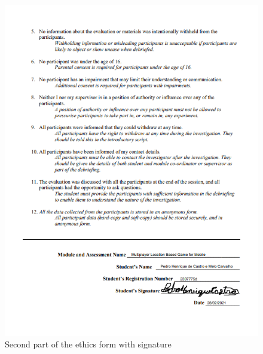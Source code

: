 \documentclass{dissertation}
\begin{document}
\begin{appendices}
\begin{figure}[H]
\centering
\includegraphics[width = 14cm]{images/signed-form2.png}
\caption{Second part of the ethics form with signature}
\label{fig:e2}
\end{figure}

\end{appendices}





\end{document}
